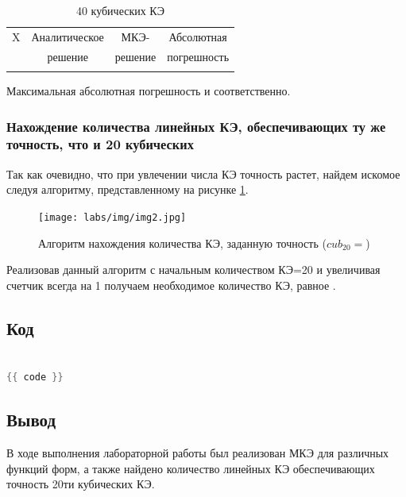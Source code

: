 {{{{{\begin{table}[H]
\centering
\begin{tabular}{|c|c|c|c|}
\hline
X & Аналитическое & МКЭ-    & Абсолютная \\
  & решение       & решение & погрешность \\
\hline
 \\
\hline
\end{tabular}
\caption{40 кубических КЭ}
\label{table:lin_40}
\end{table}

Максимальная абсолютная погрешность  и  соответственно.


\subsubsection{Нахождение количества линейных КЭ, обеспечивающих ту же точность, что и 20 кубических}

Так как очевидно, что при увлечении числа КЭ точность растет, найдем искомое следуя алгоритму, представленному на рисунке \ref{alg}.

\begin{figure}[H]
\centerline{\texttt{[image: labs/img/img2.jpg]}}
\caption{Алгоритм нахождения количества КЭ, заданную точность ($cub_{20} = $)}
\label{alg}
\end{figure}

Реализовав данный алгоритм с начальным количеством КЭ=20 и увеличивая счетчик всегда на 1 получаем необходимое количество КЭ, равное .

\subsection{Код}

\begin{lstlisting}[language=c++, label=prog,caption={\textit{Реализация МКЭ}}]

{{ code }}

\end{lstlisting}
\subsection{Вывод}

В ходе выполнения лабораторной работы был реализован МКЭ для различных функций форм, а также найдено количество линейных КЭ обеспечивающих точность 20ти кубических КЭ.

}}}}}

